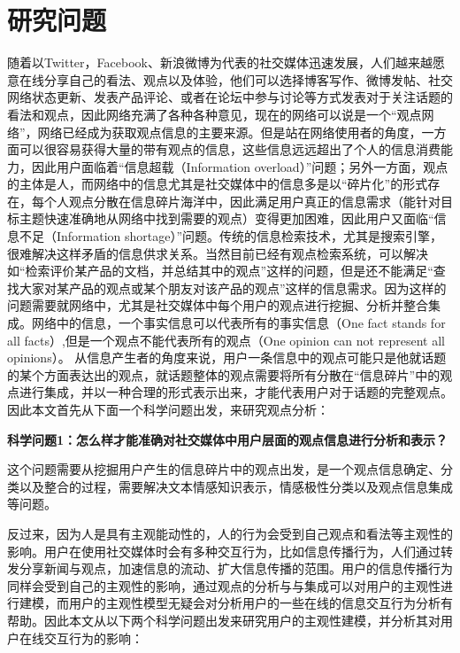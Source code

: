 \section{研究问题}
\label{point}
随着以Twitter，Facebook、新浪微博为代表的社交媒体迅速发展，人们越来越愿意在线分享自己的看法、观点以及体验，他们可以选择博客写作、微博发帖、社交网络状态更新、发表产品评论、或者在论坛中参与讨论等方式发表对于关注话题的看法和观点，因此网络充满了各种各种意见，现在的网络可以说是一个“观点网络”，网络已经成为获取观点信息的主要来源。但是站在网络使用者的角度，一方面可以很容易获得大量的带有观点的信息，这些信息远远超出了个人的信息消费能力，因此用户面临着“信息超载（Information overload）”问题；另外一方面，观点的主体是人，而网络中的信息尤其是社交媒体中的信息多是以“碎片化”的形式存在，每个人观点分散在信息碎片海洋中，因此满足用户真正的信息需求（能针对目标主题快速准确地从网络中找到需要的观点）变得更加困难，因此用户又面临“信息不足（Information shortage）”问题。传统的信息检索技术，尤其是搜索引擎，很难解决这样矛盾的信息供求关系。当然目前已经有观点检索系统，可以解决如“检索评价某产品的文档，并总结其中的观点”这样的问题，但是还不能满足“查找大家对某产品的观点或某个朋友对该产品的观点”这样的信息需求。因为这样的问题需要就网络中，尤其是社交媒体中每个用户的观点进行挖掘、分析并整合集成。网络中的信息，一个事实信息可以代表所有的事实信息（One fact stands for all facts）,但是一个观点不能代表所有的观点（One opinion can not represent all opinions）。
从信息产生者的角度来说，用户一条信息中的观点可能只是他就话题的某个方面表达出的观点，就话题整体的观点需要将所有分散在“信息碎片”中的观点进行集成，并以一种合理的形式表示出来，才能代表用户对于话题的完整观点。
因此本文首先从下面一个科学问题出发，来研究观点分析：

\textbf{科学问题1：怎么样才能准确对社交媒体中用户层面的观点信息进行分析和表示？}

这个问题需要从挖掘用户产生的信息碎片中的观点出发，是一个观点信息确定、分类以及整合的过程，需要解决文本情感知识表示，情感极性分类以及观点信息集成等问题。

反过来，因为人是具有主观能动性的，人的行为会受到自己观点和看法等主观性的影响。用户在使用社交媒体时会有多种交互行为，比如信息传播行为，人们通过转发分享新闻与观点，加速信息的流动、扩大信息传播的范围。用户的信息传播行为同样会受到自己的主观性的影响，通过观点的分析与与集成可以对用户的主观性进行建模，而用户的主观性模型无疑会对分析用户的一些在线的信息交互行为分析有帮助。因此本文从以下两个科学问题出发来研究用户的主观性建模，并分析其对用户在线交互行为的影响：

